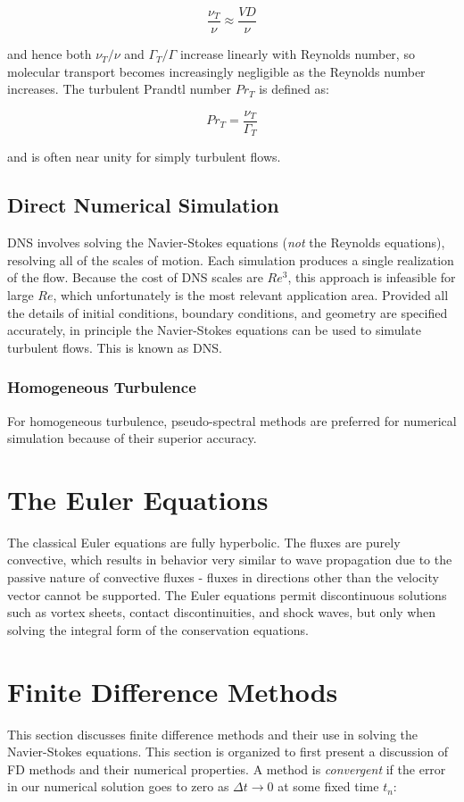 \documentclass[10pt]{article}
\newcommand{\beq}{\begin{equation}}
\newcommand{\eeq}{\end{equation}}
\begin{document}
\begin{flushleft}
\beq
\frac{\nu_T}{\nu}\approx\frac{VD}{\nu}
\eeq

and hence both \(\nu_T/\nu\) and \(\Gamma_T/\Gamma\) increase linearly with Reynolds number, so molecular transport becomes increasingly negligible as the Reynolds number increases. The turbulent Prandtl number \(Pr_T\) is defined as:

\beq
Pr_T=\frac{\nu_T}{\Gamma_T}
\eeq

and is often near unity for simply turbulent flows. 



\subsection{Direct Numerical Simulation}
DNS involves solving the Navier-Stokes equations (\textit{not} the Reynolds equations), resolving all of the scales of motion. Each simulation produces a single realization of the flow. Because the cost of DNS scales are \(Re^3\), this approach is infeasible for large \(Re\), which unfortunately is the most relevant application area. Provided all the details of initial conditions, boundary conditions, and geometry are specified accurately, in principle the Navier-Stokes equations can be used to simulate turbulent flows. This is known as DNS. 

\subsubsection{Homogeneous Turbulence}
For homogeneous turbulence, pseudo-spectral methods are preferred for numerical simulation because of their superior accuracy. 


\section{The Euler Equations}
The classical Euler equations are fully hyperbolic. The fluxes are purely convective, which results in behavior very similar to wave propagation due to the passive nature of convective fluxes - fluxes in directions other than the velocity vector cannot be supported. The Euler equations permit discontinuous solutions such as vortex sheets, contact discontinuities, and shock waves, but only when solving the integral form of the conservation equations. %

\section{Finite Difference Methods}
This section discusses finite difference methods and their use in solving the Navier-Stokes equations. This section is organized to first present a discussion of FD methods and their numerical properties. A method is {\it convergent} if the error in our numerical solution goes to zero as \(\Delta t\rightarrow0\) at some fixed time \(t_n\):


\end{flushleft}
\end{document}

